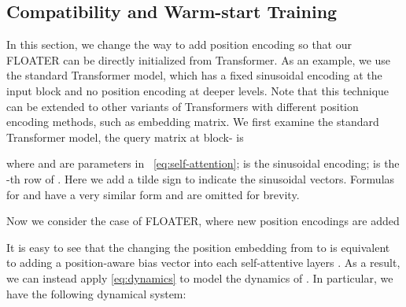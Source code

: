 \documentclass[11pt]{article}
\begin{document}
\subsection{Compatibility and Warm-start Training\label{sec:compatible}}
In this section, we change the way to add position encoding so that our FLOATER can be directly initialized from Transformer. As an example, we use the standard Transformer model, which has a fixed sinusoidal encoding at the input block and no position encoding at deeper levels. Note that this technique can be extended to other variants of Transformers with different position encoding methods, such as embedding matrix. We first examine the standard Transformer model, the query matrix  at block- is

where  and  are parameters in ~\eqref{eq:self-attention};  is the sinusoidal encoding;  is the -th row of . Here we add a tilde sign to indicate the sinusoidal vectors. Formulas for  and  have a very similar form and are omitted for brevity.

Now we consider the case of FLOATER, where new position encodings  are added

It is easy to see that the changing the position embedding from  to  is equivalent to adding a position-aware bias vector  into each self-attentive layers . As a result, we can instead apply \eqref{eq:dynamics} to model the dynamics of . In particular, we have the following dynamical system:
\end{document}
